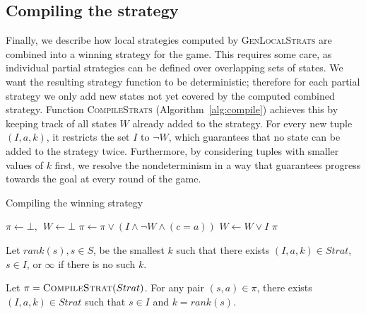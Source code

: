 \subsection{Compiling the strategy}

Finally, we describe how local strategies computed by
\textsc{GenLocalStrats} are combined into a winning strategy for
the game.  This requires some care, as individual partial
strategies can be defined over overlapping sets of states.  We
want the resulting strategy function to be deterministic;
therefore for each partial strategy we only add new states not yet
covered by the computed combined strategy.  Function
\textsc{CompileStrats} (Algorithm~\ref{alg:compile}) achieves this by keeping track of all
states $W$ already added to the strategy.  For every new tuple $(I, a,
k)$, it restricts the set $I$ to $\neg W$, which guarantees that no
state can be added to the strategy twice.  Furthermore, by
considering tuples with smaller values of $k$ first, we resolve the
nondeterminism in a way that guarantees progress towards the goal
at every round of the game.

\begin{algorithm}[t]
   \caption{Compiling the  winning strategy}\label{alg:compile}
   \begin{algorithmic}[1]
            \State $\pi \gets \bot,~~W \gets \bot$
             
                \State $\pi \gets \pi \lor (I \land \neg W \land (c=a))$
                \State $W \gets W \lor I$
            \EndFor
            \State \Return $\pi$
        \EndFunction
    \end{algorithmic}
\end{algorithm}

Let $rank(s), s\in S$, be the smallest $k$ such that there exists
$(I,a,k) \in Strat$, $s \in I$, or $\infty$ if there is no such
$k$.

\begin{proposition}\label{prop:rank}
    Let $\pi=\textsc{CompileStrat}(Strat)$. For any pair $(s,a)
    \in \pi$, there exists $(I, a, k) \in Strat$ such that $s\in
    I$ and $k=rank(s)$.
\end{proposition}



